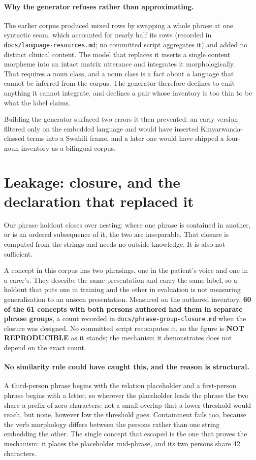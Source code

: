 \paragraph{Why the generator refuses rather than approximating.} The earlier
corpus produced mixed rows by swapping a whole phrase at one syntactic seam,
which accounted for nearly half its rows (recorded in
\texttt{docs/language-resources.md}; no committed script aggregates it) and added
no distinct clinical content. The
model that replaces it inserts a single content morpheme into an intact matrix
utterance and integrates it morphologically. That requires a noun class, and a
noun class is a fact about a language that cannot be inferred from the corpus.
The generator therefore declines to emit anything it cannot integrate, and
declines a pair whose inventory is too thin to be what the label claims.

Building the generator surfaced two errors it then prevented: an early version
filtered only on the embedded language and would have inserted
Kinyarwanda-classed terms into a Swahili frame, and a later one would have
shipped a four-noun inventory as a bilingual corpus.

\section{Leakage: closure, and the declaration that replaced it}
\label{app:leakage}

Our phrase holdout closes over nesting: where one phrase is contained in
another, or is an ordered subsequence of it, the two are inseparable. That
closure is computed from the strings and needs no outside knowledge. It is also
not sufficient.

A concept in this corpus has two phrasings, one in the patient's voice and one
in a carer's. They describe the same presentation and carry the same label, so
a holdout that puts one in training and the other in evaluation is not measuring
generalisation to an unseen presentation. Measured on the authored inventory,
\textbf{60 of the 61 concepts with both persons authored had them in separate
phrase groups}, a count recorded in \texttt{docs/phrase-group-closure.md} when
the closure was designed. No committed script recomputes it, so the figure is
\textbf{NOT REPRODUCIBLE} as it stands; the mechanism it demonstrates does not
depend on the exact count.

\paragraph{No similarity rule could have caught this, and the reason is
structural.} A third-person phrase begins with the relation placeholder and a
first-person phrase begins with a letter, so wherever the placeholder leads the
phrase the two share a prefix of zero characters: not a small overlap that a
lower threshold would reach, but none, however low the threshold goes.
Containment fails too, because the verb morphology differs between the persons
rather than one string embedding the other. The single concept that escaped is
the one that proves the mechanism: it places the placeholder mid-phrase, and its
two persons share 42 characters.

